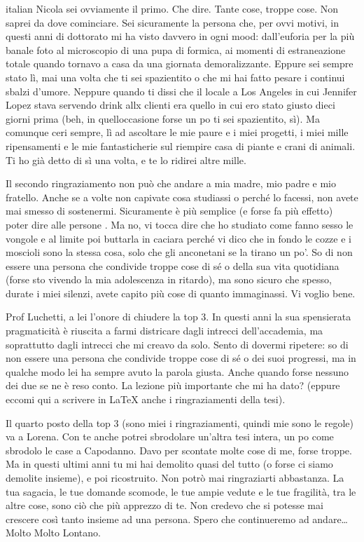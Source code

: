 \begin{otherlanguage*}{italian}
Nicola sei ovviamente il primo. Che dire. Tante cose, troppe cose. Non saprei da dove cominciare. Sei sicuramente la persona che, per ovvi motivi, in questi anni di dottorato mi ha visto davvero in ogni mood: dall'euforia per la più banale foto al microscopio di una pupa di formica, ai momenti di estraneazione totale quando tornavo a casa da una giornata demoralizzante. Eppure sei sempre stato lì, mai una volta che ti sei spazientito o che mi hai fatto pesare i continui sbalzi d'umore. Neppure quando ti dissi che il locale a Los Angeles in cui Jennifer Lopez stava servendo drink allx clienti era quello in cui ero stato giusto dieci giorni prima (beh, in quell\curlyapostrophe{}occasione forse un po\curlyapostrophe{} ti sei spazientito, sì). Ma comunque c\curlyapostrophe{}eri sempre, lì ad ascoltare le mie paure e i miei progetti, i miei mille ripensamenti e le mie fantasticherie sul riempire casa di piante e crani di animali. Ti ho già detto di sì una volta, e te lo ridirei altre mille.

Il secondo ringraziamento non può che andare a mia madre, mio padre e mio fratello. Anche se a volte non capivate cosa studiassi o perché lo facessi, non avete mai smesso di sostenermi. Sicuramente è più semplice (e forse fa più effetto) poter dire alle persone . Ma no, vi tocca dire che ho studiato come fanno sesso le vongole e al limite poi buttarla in caciara perché vi dico che in fondo le cozze e i moscioli sono la stessa cosa, solo che gli anconetani se la tirano un po'. So di non essere una persona che condivide troppe cose di sé o della sua vita quotidiana (forse sto vivendo la mia adolescenza in ritardo), ma sono sicuro che spesso, durate i miei silenzi, avete capito più cose di quanto immaginassi. Vi voglio bene.

Prof Luchetti, a lei l'onore di chiudere la top 3. In questi anni la sua spensierata pragmaticità è riuscita a farmi districare dagli intrecci dell'accademia, ma soprattutto dagli intrecci che mi creavo da solo. Sento di dovermi ripetere: so di non essere una persona che condivide troppe cose di sé o dei suoi progressi, ma in qualche modo lei ha sempre avuto la parola giusta. Anche quando forse nessuno dei due se ne è reso conto. La lezione più importante che mi ha dato?  (eppure eccomi qui a scrivere in \LaTeX{} anche i ringraziamenti della tesi).

Il quarto posto della top 3 (sono miei i ringraziamenti, quindi mie sono le regole) va a Lorena. Con te anche potrei sbrodolare un'altra tesi intera, un po\curlyapostrophe{} come sbrodolo le case a Capodanno. Davo per scontate molte cose di me, forse troppe. Ma in questi ultimi anni tu mi hai demolito quasi del tutto (o forse ci siamo demolite insieme), e poi ricostruito. Non potrò mai ringraziarti abbastanza. La tua sagacia, le tue domande scomode, le tue ampie vedute e le tue fragilità, tra le altre cose, sono ciò che più apprezzo di te. Non credevo che si potesse mai crescere così tanto insieme ad una persona. Spero che continueremo ad andare\ldots{} Molto Molto Lontano.


\end{otherlanguage*}
